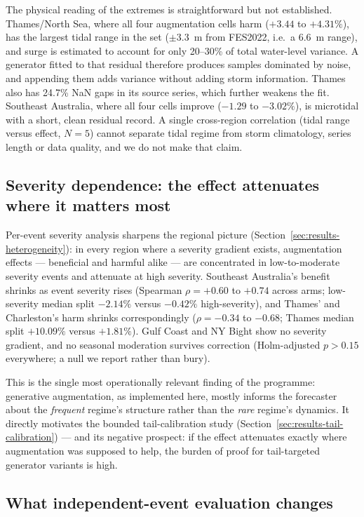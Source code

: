 The physical reading of the extremes is straightforward but not
established. Thames/North Sea, where all four augmentation cells harm
($+3.44$ to $+4.31\%$), has the largest tidal range in the set ($\pm3.3$~m
from FES2022, i.e.\ a 6.6~m range), and surge is estimated to account for
only 20--30\% of total water-level variance. A generator fitted to that
residual therefore produces samples dominated by noise, and appending them
adds variance without adding storm information. Thames also has 24.7\% NaN
gaps in its source series, which further weakens the fit. Southeast
Australia, where all four cells improve ($-1.29$ to $-3.02\%$), is
microtidal with a short, clean residual record. A single cross-region
correlation (tidal range versus effect, $N=5$) cannot separate tidal regime
from storm climatology, series length or data quality, and we do not make
that claim.

\subsection{Severity dependence: the effect attenuates where it matters most}
\label{subsec:why-severity}

Per-event severity analysis sharpens the regional picture
(Section~\ref{sec:results-heterogeneity}): in every region where a severity
gradient exists, augmentation effects --- beneficial and harmful alike ---
are concentrated in low-to-moderate severity events and attenuate at high
severity. Southeast Australia's benefit shrinks as event severity rises
(Spearman $\rho = +0.60$ to $+0.74$ across arms; low-severity median split
$-2.14\%$ versus $-0.42\%$ high-severity), and Thames' and Charleston's
harm shrinks correspondingly ($\rho = -0.34$ to $-0.68$; Thames median split
$+10.09\%$ versus $+1.81\%$). Gulf Coast and NY Bight show no severity
gradient, and no seasonal moderation survives correction (Holm-adjusted
$p > 0.15$ everywhere; a null we report rather than bury).

This is the single most operationally relevant finding of the programme:
generative augmentation, as implemented here, mostly informs the forecaster
about the \emph{frequent} regime's structure rather than the \emph{rare}
regime's dynamics. It directly motivates the bounded tail-calibration study
(Section~\ref{sec:results-tail-calibration}) --- and its negative prospect:
if the effect attenuates exactly where augmentation was supposed to help,
the burden of proof for tail-targeted generator variants is high.

\subsection{What independent-event evaluation changes}
\label{subsec:why-events}

